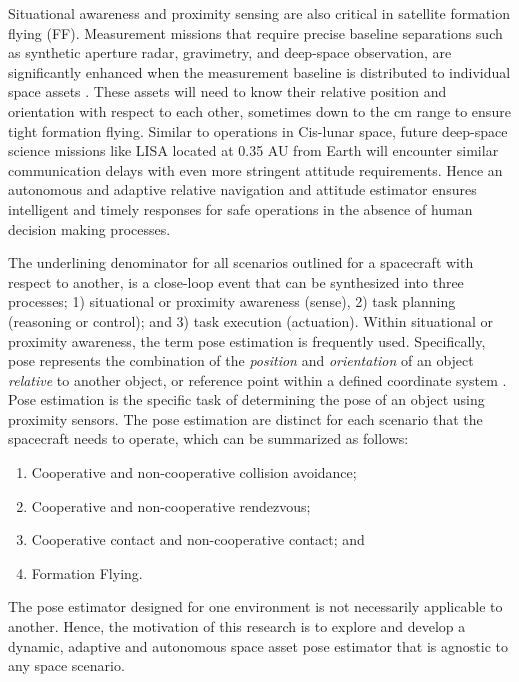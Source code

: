 Situational awareness and proximity sensing are also critical in satellite formation flying (FF). Measurement missions that require precise baseline separations such as synthetic aperture radar, gravimetry, and deep-space observation, are significantly enhanced when the measurement baseline is distributed to individual space assets \cite{frasierAdaptiveKF18}. These assets will need to know their relative position and orientation with respect to each other, sometimes down to the cm range to ensure tight formation flying. Similar to operations in Cis-lunar space, future deep-space science missions like LISA located at 0.35 AU from Earth \cite{amatoFormationFlying19} will encounter similar communication delays with even more stringent attitude requirements. Hence an autonomous and adaptive relative navigation and attitude estimator ensures intelligent and timely responses for safe operations in the absence of human decision making processes.   

The underlining denominator for all scenarios outlined for a spacecraft with respect to another, is a close-loop event that can be synthesized into three processes; 1) situational or proximity awareness (sense), 2) task planning (reasoning or control); and 3) task execution (actuation). Within situational or proximity awareness, the term pose estimation is frequently used. Specifically, pose represents the combination of the \textit{position} and \textit{orientation} of an object \textit{relative} to another object, or reference point within a defined coordinate system \cite{PrezVillar2017SpacecraftPE}.  Pose estimation is the specific task of determining the pose of an object using proximity sensors. The pose estimation are distinct for each scenario that the spacecraft needs to operate, which can be summarized as follows:
\begin{enumerate}
    \item Cooperative and non-cooperative collision avoidance; 
    \item Cooperative and non-cooperative rendezvous; 
    \item Cooperative contact and non-cooperative contact; and
    \item Formation Flying.
\end{enumerate}

The pose estimator designed for one environment is not necessarily applicable to another. Hence, the motivation of this research is to explore and develop a dynamic, adaptive and autonomous space asset pose estimator that is agnostic to any space scenario.

